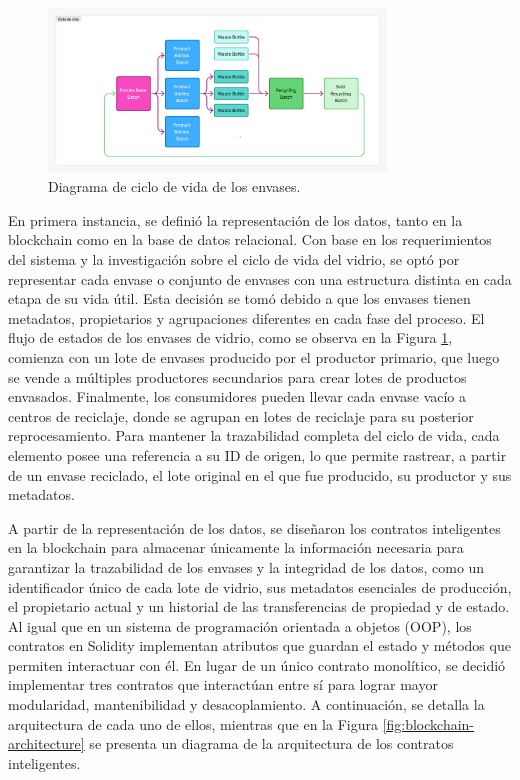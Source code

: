 \begin{figure}[!htb]
    \centering
    \includegraphics[width=0.8\textwidth]{Figures/data-lifecycle.png}
    \caption{Diagrama de ciclo de vida de los envases.}
    \label{fig:data-lifecycle}
\end{figure}

En primera instancia, se definió la representación de los datos, tanto en la blockchain como en la base de datos relacional. Con base en los requerimientos del sistema y la investigación sobre el ciclo de vida del vidrio, se optó por representar cada envase o conjunto de envases con una estructura distinta en cada etapa de su vida útil. Esta decisión se tomó debido a que los envases tienen metadatos, propietarios y agrupaciones diferentes en cada fase del proceso. El flujo de estados de los envases de vidrio, como se observa en la Figura \ref{fig:data-lifecycle}, comienza con un lote de envases producido por el productor primario, que luego se vende a múltiples productores secundarios para crear lotes de productos envasados. Finalmente, los consumidores pueden llevar cada envase vacío a centros de reciclaje, donde se agrupan en lotes de reciclaje para su posterior reprocesamiento. Para mantener la trazabilidad completa del ciclo de vida, cada elemento posee una referencia a su ID de origen, lo que permite rastrear, a partir de un envase reciclado, el lote original en el que fue producido, su productor y sus metadatos.

A partir de la representación de los datos, se diseñaron los contratos inteligentes en la blockchain para almacenar únicamente la información necesaria para garantizar la trazabilidad de los envases y la integridad de los datos, como un identificador único de cada lote de vidrio, sus metadatos esenciales de producción, el propietario actual y un historial de las transferencias de propiedad y de estado. Al igual que en un sistema de programación orientada a objetos (OOP), los contratos en Solidity implementan atributos que guardan el estado y métodos que permiten interactuar con él. En lugar de un único contrato monolítico, se decidió implementar tres contratos que interactúan entre sí para lograr mayor modularidad, mantenibilidad y desacoplamiento. A continuación, se detalla la arquitectura de cada uno de ellos, mientras que en la Figura \ref{fig:blockchain-architecture} se presenta un diagrama de la arquitectura de los contratos inteligentes.

